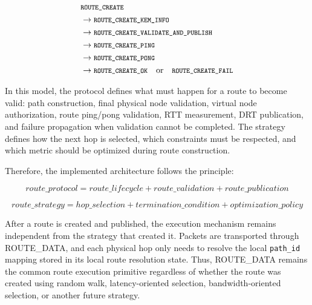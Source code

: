 \documentclass[12pt,a4paper]{article}
\newcommand{\codebreak}[1]{{\footnotesize\ttfamily #1}}
\newcommand{\codemath}[1]{\mbox{\footnotesize\ttfamily #1}}
\begin{document}
\begin{equation}
\begin{aligned}
&\codemath{ROUTE\_\allowbreak{}CREATE} \\
&\rightarrow \codemath{ROUTE\_\allowbreak{}CREATE\_\allowbreak{}KEM\_\allowbreak{}INFO} \\
&\rightarrow \codemath{ROUTE\_\allowbreak{}CREATE\_\allowbreak{}VALIDATE\_\allowbreak{}AND\_\allowbreak{}PUBLISH} \\
&\rightarrow \codemath{ROUTE\_\allowbreak{}CREATE\_\allowbreak{}PING} \\
&\rightarrow \codemath{ROUTE\_\allowbreak{}CREATE\_\allowbreak{}PONG} \\
&\rightarrow \codemath{ROUTE\_\allowbreak{}CREATE\_\allowbreak{}OK}
\quad \text{or} \quad
\codemath{ROUTE\_\allowbreak{}CREATE\_\allowbreak{}FAIL}
\end{aligned}
\end{equation}

In this model, the protocol defines what must happen for a route to become valid: path construction, final physical node validation, virtual node authorization, route ping/pong validation, RTT measurement, DRT publication, and failure propagation when validation cannot be completed. The strategy defines how the next hop is selected, which constraints must be respected, and which metric should be optimized during route construction.

Therefore, the implemented architecture follows the principle:

\begin{equation}
    route\_protocol = route\_lifecycle + route\_validation + route\_publication
\end{equation}

\begin{equation}
    route\_strategy = hop\_selection + termination\_condition + optimization\_policy
\end{equation}

After a route is created and published, the execution mechanism remains independent from the strategy that created it. Packets are transported through \codebreak{ROUTE\_\allowbreak{}DATA}, and each physical hop only needs to resolve the local \texttt{path\_id} mapping stored in its local route resolution state. Thus, \codebreak{ROUTE\_\allowbreak{}DATA} remains the common route execution primitive regardless of whether the route was created using random walk, latency-oriented selection, bandwidth-oriented selection, or another future strategy.
\end{document}
